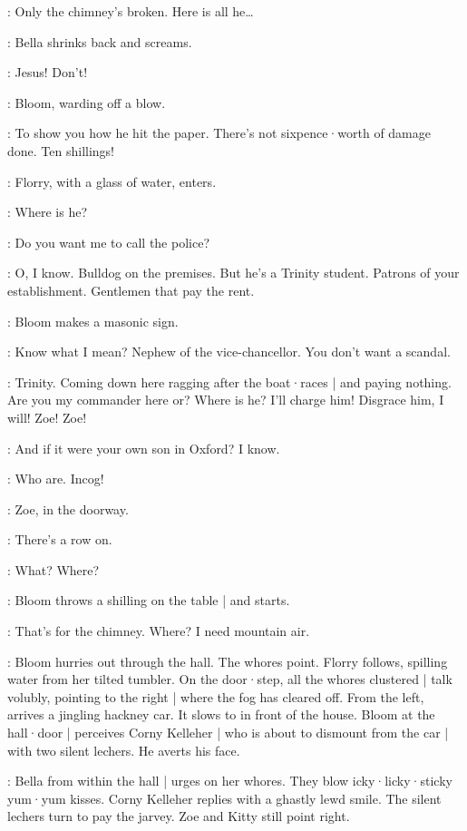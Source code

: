 \Bloom:
Only the chimney's broken.
Here is all he…

:
Bella shrinks back and screams.

\Bella:
Jesus!
Don't!

:
Bloom,
warding off a blow.

\Bloom:
To show you how he hit the paper.
%
There's not sixpence·worth of damage done.
Ten shillings!

:
Florry,
with a glass of water,
enters.

\Florry:
Where is he?

\Bella:
Do you want me to call the police?

\Bloom:
O,
I know.
Bulldog on the premises.
But he's a Trinity student.
Patrons of your establishment.
Gentlemen that pay the rent.

:
Bloom makes a masonic sign.

\Bloom:
Know what I mean?
Nephew of the vice-chancellor.
You don't want a scandal.%

\Bella:
Trinity.
Coming down here ragging after the boat·races |
and paying nothing.
Are you my commander here or?
Where is he?
I'll charge him!
Disgrace him,
I will!
Zoe! Zoe!

\Bloom:
And if it were your own son in Oxford?
I know.

\Bella:
Who are.
Incog!

:
Zoe,
in the doorway.

\Zoe:
There's a row on.

\Bloom:
What?
Where?

:
Bloom throws a shilling on the table |
and starts.

\Bloom:
That's for the chimney.
Where?
I need mountain air.

:
Bloom hurries out through the hall.
The whores point.
Florry follows,
spilling water from her tilted tumbler.
On the door·step,
all the whores clustered |
talk volubly,
pointing to the right |
where the fog has cleared off.
From the left,
arrives a jingling hackney car.
It slows to in front of the house.
Bloom at the hall·door |
perceives Corny Kelleher |
who is about to dismount from the car |
with two silent lechers.
%
He averts his face.

:
Bella from within the hall |
urges on her whores.
They blow icky·licky·sticky yum·yum kisses.
Corny Kelleher replies with a ghastly lewd smile.
The silent lechers turn to pay the jarvey.
Zoe and Kitty still point right.


